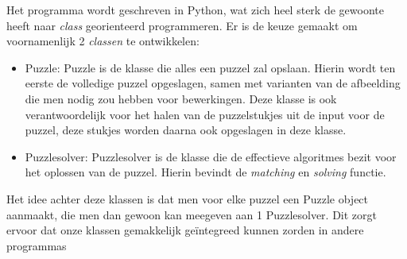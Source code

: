 Het programma wordt geschreven in Python, wat zich heel sterk de gewoonte heeft naar \textit{class} georienteerd programmeren.
 Er is de keuze gemaakt om voornamenlijk 2 \textit{classen} te ontwikkelen:
\begin{itemize}
    \item Puzzle: Puzzle is de klasse die alles een puzzel zal opslaan. Hierin wordt ten eerste de volledige puzzel opgeslagen, samen met varianten van de afbeelding die men nodig zou hebben voor bewerkingen.
            Deze klasse is ook verantwoordelijk voor het halen van de puzzelstukjes uit de input voor de puzzel, deze stukjes worden daarna ook opgeslagen in deze klasse.
    \item Puzzlesolver: Puzzlesolver is de klasse die de effectieve algoritmes bezit voor het oplossen van de puzzel. Hierin bevindt de \textit{matching} en \textit{solving} functie.
\end{itemize}

Het idee achter deze klassen is dat men voor elke puzzel een Puzzle object aanmaakt, die men dan gewoon kan meegeven aan 1 Puzzlesolver. Dit zorgt ervoor dat onze klassen gemakkelijk
ge\"{i}ntegreed kunnen zorden in andere programmas